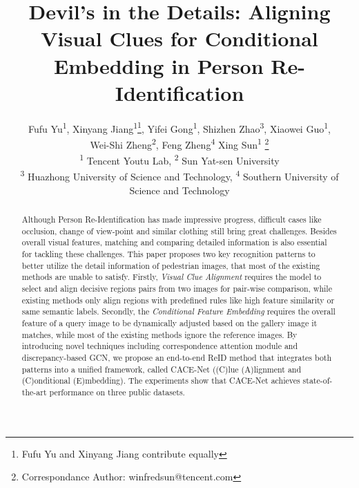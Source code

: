 \documentclass[final]{cvpr}
\begin{document}
\title{Devil's in the Details: Aligning Visual Clues for Conditional Embedding in Person Re-Identification}

\author
{Fufu Yu\textsuperscript{\rm 1}, 
Xinyang Jiang\textsuperscript{\rm 1}\thanks{Fufu Yu and Xinyang Jiang contribute equally}, Yifei Gong\textsuperscript{\rm 1}, 
Shizhen Zhao\textsuperscript{\rm 3}, 
Xiaowei Guo\textsuperscript{\rm 1}, \\ 
Wei-Shi Zheng\textsuperscript{\rm 2}, 
Feng Zheng\textsuperscript{\rm 4}
Xing Sun\textsuperscript{\rm 1} \thanks{Correspondance Author: winfredsun@tencent.com} \\
\textsuperscript{\rm 1} Tencent Youtu Lab, \textsuperscript{\rm 2} Sun Yat-sen University \\
 \textsuperscript{\rm 3} Huazhong University of Science and Technology, \textsuperscript{\rm 4} Southern University of Science and Technology\\
}


\maketitle



\begin{abstract}
Although Person Re-Identification has made impressive progress, difficult cases like occlusion, change of view-point and similar clothing still bring great challenges. 
Besides overall visual features, matching and comparing detailed information is also essential for tackling these challenges. 
This paper proposes two key recognition patterns to better utilize the detail information of pedestrian images, that most of the existing methods are unable to satisfy. 
Firstly, \emph{Visual Clue Alignment} requires the model to select and align decisive regions pairs from two images for pair-wise comparison, while existing methods only align regions with predefined rules like high feature similarity or same semantic labels. 
Secondly, the \emph{Conditional Feature Embedding}  requires the overall feature of a query image to be dynamically adjusted based on the gallery image it  matches, while most of the existing methods ignore the reference images.  
By introducing novel techniques including correspondence attention module and discrepancy-based GCN, we propose an end-to-end ReID method that integrates both patterns into a unified framework, called CACE-Net ((C)lue (A)lignment and (C)onditional (E)mbedding). The experiments show that CACE-Net achieves state-of-the-art performance on three public datasets. 
\end{abstract}
\end{document}

